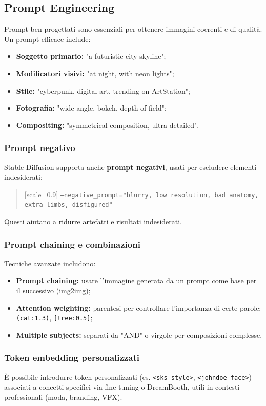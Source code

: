\subsection*{Prompt Engineering}

Prompt ben progettati sono essenziali per ottenere immagini coerenti e di qualità. Un prompt efficace include:

\begin{itemize}
    \item \textbf{Soggetto primario:} "a futuristic city skyline";
    \item \textbf{Modificatori visivi:} "at night, with neon lights";
    \item \textbf{Stile:} "cyberpunk, digital art, trending on ArtStation";
    \item \textbf{Fotografia:} "wide-angle, bokeh, depth of field";
    \item \textbf{Compositing:} "symmetrical composition, ultra-detailed".
\end{itemize}

\subsubsection*{Prompt negativo}

Stable Diffusion supporta anche \textbf{prompt negativi}, usati per escludere elementi indesiderati:

\begin{quote}[scale=0.9]
    \texttt{--negative\_prompt="blurry, low resolution, bad anatomy, extra limbs, disfigured"}
\end{quote}

Questi aiutano a ridurre artefatti e risultati indesiderati.

\subsubsection*{Prompt chaining e combinazioni}

Tecniche avanzate includono:
\begin{itemize}
    \item \textbf{Prompt chaining:} usare l’immagine generata da un prompt come base per il successivo (img2img);
    \item \textbf{Attention weighting:} parentesi per controllare l'importanza di certe parole: \texttt{(cat:1.3)}, \texttt{[tree:0.5]};
    \item \textbf{Multiple subjects:} separati da "AND" o virgole per composizioni complesse.
\end{itemize}

\subsubsection*{Token embedding personalizzati}

È possibile introdurre token personalizzati (es. \texttt{<sks style>}, \texttt{<johndoe face>}) associati a concetti specifici via fine-tuning o DreamBooth, utili in contesti professionali (moda, branding, VFX).